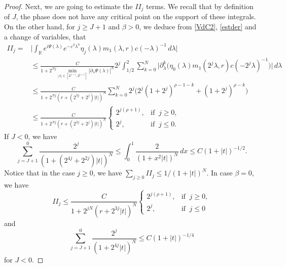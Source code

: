 \documentclass[10pt,leqno]{amsart}
\numberwithin{equation}{section}
\newcommand{\field}[1]{\mathbb{#1}}
\newcommand{\R}{\field{R}}          		%
\begin{document}
\begin{proof}
Next, we are going to estimate the $II_j$ terms. We recall that by definition of $J$, the phase does not have any critical point on the support of these integrals. On the other hand, 
for $j\geq J+1$ and $\beta> 0$, we deduce from \eqref{VdC2}, \eqref{estder} and a change of variables, that 
\begin{align*}
II_j=&\Big|\int_\R e^{i\Psi(\lambda)}e^{-\varepsilon^2\lambda^4} \eta_{j}(\lambda) m_1 (\lambda ,r) c(-\lambda )^{-1}\, d\lambda\Big|\\
&\leq \frac{C}{1+2^{Nj}\min_{|\lambda|\in [2^{j-1},2^{j+1}] } |\partial_\lambda\Psi(\lambda)|^N} 2^j \int_{1/2}^2 \sum_{k=0}^{N} 
\big|\partial_\lambda^k \big(\eta_0(\lambda)m_1(2^j \lambda,r)c(-2^j\lambda )^{-1}\big)\big|\, d\lambda \\
&\leq \frac{C}{1+2^{Nj}(r+(2^{3j}+2^{j}) |t|)^N}  \sum_{k=0}^{N} 2^j  \big(2^j (1+2^j)^{\rho -1 -k} +(1+2^j)^{\rho - k}\big)\\ \iffalse
&\leq  \frac{C}{1+2^{Nj}(r+(2^{3j}+2^{j}) |t|)^N}  \sum_{k=0}^{N} \big(2^{2j } (1+2^j)^{\rho - 1 -k} +2^{j } (1+2^j)^{\rho -k} \big)\\  \fi
&\leq   \frac{C}{1+2^{Nj}(r+(2^{3j}+2^{j}) |t|)^N} \begin{cases}2^{j (\rho +1)},&\mbox{if }\ j\geq 0, \\
2^j ,&\mbox{if }\  j\leq 0 . \end{cases}
\end{align*}
If $J < 0$, we have
$$\sum_{j=J+1}^{0}\dfrac{2^j}{(1+(2^{4j} +2^{2j} )|t| )^N} 
\leq \int_0^1 \dfrac{2}{(1+x^2 |t|)^N}\, dx 
\leq C(1+|t|)^{-1/2}.$$
Notice that in the case $j\geq 0$, we have $\sum_{j\geq 0} II_j \leq 1/(1+|t|)^N$.
In case $\beta=0$, we have 
\[
 II_j\leq   \frac{C}{1+2^{jN}(r+2^{3j} |t|)^N} \begin{cases}2^{j (\rho +1)},&\mbox{if }\ j\geq 0, \\
2^j ,&\mbox{if }\  j\leq 0  \end{cases}
\]
and 
\[
\sum_{j=J+1}^{0}\dfrac{2^j}{(1+2^{4j}|t| )^N} 
\leq C(1+|t|)^{-1/4}
\] for $J<0$.

\end{proof}
\end{document}
